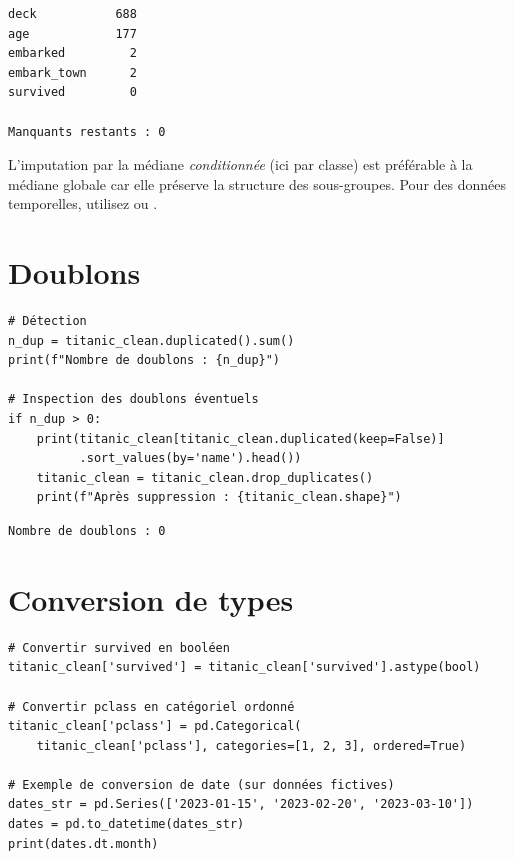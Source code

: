 \begin{codeoutput}
\begin{verbatim}
deck           688
age            177
embarked         2
embark_town      2
survived         0

Manquants restants : 0
\end{verbatim}
\end{codeoutput}

\begin{bonnepratique}
L'imputation par la m\'ediane \emph{conditionn\'ee} (ici par classe) est pr\'ef\'erable \`a la m\'ediane globale car elle pr\'eserve la structure des sous-groupes. Pour des donn\'ees temporelles, utilisez  ou .
\end{bonnepratique}

\section{Doublons}

\begin{codeblock}[title=\textbf{Python}]
\begin{verbatim}
# Détection
n_dup = titanic_clean.duplicated().sum()
print(f"Nombre de doublons : {n_dup}")

# Inspection des doublons éventuels
if n_dup > 0:
    print(titanic_clean[titanic_clean.duplicated(keep=False)]
          .sort_values(by='name').head())
    titanic_clean = titanic_clean.drop_duplicates()
    print(f"Après suppression : {titanic_clean.shape}")
\end{verbatim}
\end{codeblock}

\begin{codeoutput}
\begin{verbatim}
Nombre de doublons : 0
\end{verbatim}
\end{codeoutput}

\section{Conversion de types}

\begin{codeblock}[title=\textbf{Python}]
\begin{verbatim}
# Convertir survived en booléen
titanic_clean['survived'] = titanic_clean['survived'].astype(bool)

# Convertir pclass en catégoriel ordonné
titanic_clean['pclass'] = pd.Categorical(
    titanic_clean['pclass'], categories=[1, 2, 3], ordered=True)

# Exemple de conversion de date (sur données fictives)
dates_str = pd.Series(['2023-01-15', '2023-02-20', '2023-03-10'])
dates = pd.to_datetime(dates_str)
print(dates.dt.month)
\end{verbatim}
\end{codeblock}


